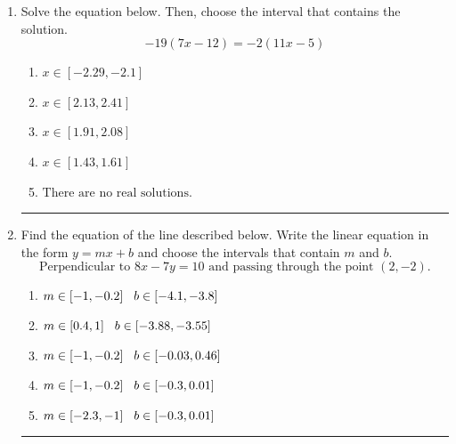 \documentclass[14pt]{extbook}
\newcommand{\litem}[1]{\item#1\hspace*{-1cm}\rule{\textwidth}{0.4pt}}
\begin{document}
\begin{enumerate}
{\begin{enumerate}[label=\Alph*.]
\end{enumerate} }
\litem{
Solve the equation below. Then, choose the interval that contains the solution.\[ -19(7x -12) = -2(11x -5) \]\begin{enumerate}[label=\Alph*.]
\item \( x \in [-2.29, -2.1] \)
\item \( x \in [2.13, 2.41] \)
\item \( x \in [1.91, 2.08] \)
\item \( x \in [1.43, 1.61] \)
\item \( \text{There are no real solutions.} \)

\end{enumerate} }
\litem{
Find the equation of the line described below. Write the linear equation in the form $ y=mx+b $ and choose the intervals that contain $m$ and $b$.\[ \text{Perpendicular to } 8 x - 7 y = 10 \text{ and passing through the point } (2, -2). \]\begin{enumerate}[label=\Alph*.]
\item \( m \in [-1, -0.2] \hspace*{3mm} b \in [-4.1, -3.8] \)
\item \( m \in [0.4, 1] \hspace*{3mm} b \in [-3.88, -3.55] \)
\item \( m \in [-1, -0.2] \hspace*{3mm} b \in [-0.03, 0.46] \)
\item \( m \in [-1, -0.2] \hspace*{3mm} b \in [-0.3, 0.01] \)
\item \( m \in [-2.3, -1] \hspace*{3mm} b \in [-0.3, 0.01] \)


\end{enumerate}}
\end{enumerate}
\end{document}

